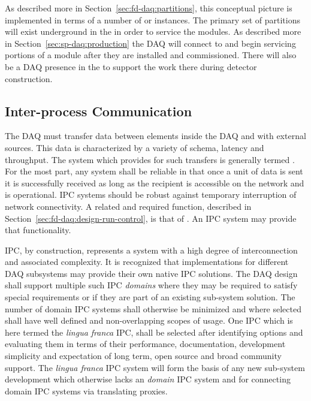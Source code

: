 
As described more in Section~\ref{sec:fd-daq:partitions}, this conceptual picture is implemented in terms of a number of  or instances. 
The primary set of partitions will exist underground in the  in order to service the  modules. 
As described more in Section~\ref{sec:sp-daq:production} the DAQ will connect to and begin servicing portions of a  module after they are installed and commissioned. 
There will also be a DAQ presence in the  to support the work there during detector construction.




  



\subsection{Inter-process Communication}
\label{sec:fd-daq:design-messages}

The DAQ must transfer data between elements inside the DAQ and with external sources. 
This data is characterized by a variety of schema, latency and throughput. 
The system which provides for such transfers is generally termed .
For the most part, any  system shall be reliable in that once a unit of data is sent it is successfully received as long as the recipient is accessible on the network and is operational. 
IPC systems should be robust against temporary interruption of network connectivity. 
A related and required function, described in Section~\ref{sec:fd-daq:design-run-control}, is that of . 
An IPC system may provide that functionality.

IPC, by construction, represents a system with a high degree of interconnection and associated complexity. 
It is recognized that implementations for different DAQ subsystems may provide their own native IPC solutions. 
The DAQ design shall support multiple such IPC \textit{domains} where they may be required to satisfy special requirements or if they are part of an existing sub-system solution. 
The number of domain IPC systems shall otherwise be minimized and where selected shall have well defined and non-overlapping scopes of usage. 
One IPC which is here termed the \textit{lingua franca} IPC, shall be selected after identifying options and evaluating them in terms of their performance, documentation, development simplicity and expectation of long term, open source and broad community support. 
The \textit{lingua franca} IPC system will form the basis of any new sub-system development which otherwise lacks an \textit{domain} IPC system and for connecting domain IPC systems via translating proxies.

